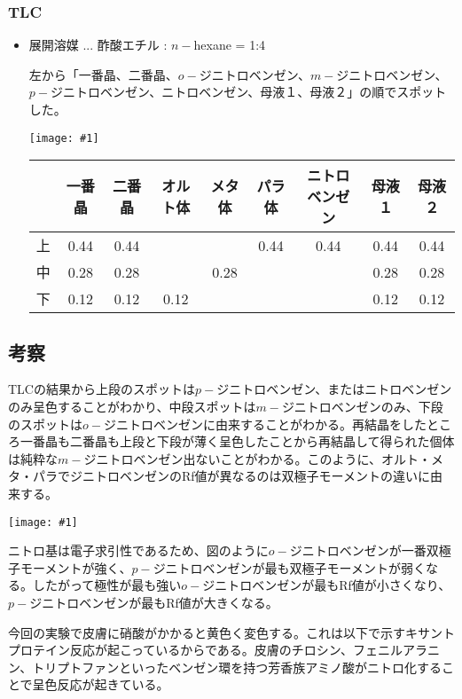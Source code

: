 \documentclass[a4paper,papersize,dvipdfmx]{jsarticle}
\newcommand{\pict}[2]{\begin{center} \texttt{[image: \#1]} \end{center}}   %
\begin{document}
\subsubsection*{TLC}
\begin{itemize}
\item 展開溶媒 ... 酢酸エチル : $n-$hexane = 1:4

左から「一番晶、二番晶、$o-$ジニトロベンゼン、$m-$ジニトロベンゼン、$p-$ジニトロベンゼン、ニトロベンゼン、母液１、母液２」の順でスポットした。

\pict{imgs/1-1.jpeg}{6}

\begin{table}[h]
\begin{tabular}{|c|c|c|c|c|c|c|c|c|}
\hline
  & 一番晶  & 二番晶  & オルト体 & メタ体  & パラ体  & ニトロベンゼン & 母液１  & 母液２  \\ \hline
上 & 0.44 & 0.44 &      &      & 0.44 & 0.44    & 0.44 & 0.44 \\ \hline
中 & 0.28 & 0.28 &      & 0.28 &      &         & 0.28 & 0.28 \\ \hline
下 & 0.12 & 0.12 & 0.12 &      &      &         & 0.12 & 0.12 \\ \hline
\end{tabular}
\end{table}

\end{itemize}
\subsection*{考察}
TLCの結果から上段のスポットは$p-$ジニトロベンゼン、またはニトロベンゼンのみ呈色することがわかり、中段スポットは$m-$ジニトロベンゼンのみ、下段のスポットは$o-$ジニトロベンゼンに由来することがわかる。再結晶をしたところ一番晶も二番晶も上段と下段が薄く呈色したことから再結晶して得られた個体は純粋な$m-$ジニトロベンゼン出ないことがわかる。このように、オルト・メタ・パラでジニトロベンゼンのRf値が異なるのは双極子モーメントの違いに由来する。

\pict{imgs/1-1.jpeg}{6}

ニトロ基は電子求引性であるため、図のように$o-$ジニトロベンゼンが一番双極子モーメントが強く、$p-$ジニトロベンゼンが最も双極子モーメントが弱くなる。したがって極性が最も強い$o-$ジニトロベンゼンが最もRf値が小さくなり、$p-$ジニトロベンゼンが最もRf値が大きくなる。

今回の実験で皮膚に硝酸がかかると黄色く変色する。これは以下で示すキサントプロテイン反応が起こっているからである。皮膚のチロシン、フェニルアラニン、トリプトファンといったベンゼン環を持つ芳香族アミノ酸がニトロ化することで呈色反応が起きている。
\end{document}
